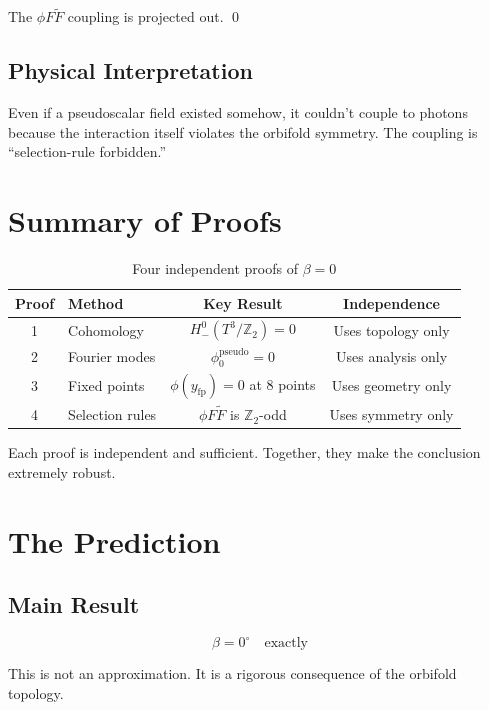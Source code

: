 \documentclass[12pt,a4paper]{article}
\begin{document}
The $\phi F\tilde{F}$ coupling is projected out. \qed

\subsection{Physical Interpretation}

Even if a pseudoscalar field existed somehow, it couldn't couple to photons because the interaction itself violates the orbifold symmetry. The coupling is ``selection-rule forbidden.''

\section{Summary of Proofs}

\begin{table}[h]
\centering
\begin{tabular}{clcc}
\toprule
Proof & Method & Key Result & Independence \\
\midrule
1 & Cohomology & $H^0_-(T^3/\mathbb{Z}_2) = 0$ & Uses topology only \\
2 & Fourier modes & $\phi_0^{\text{pseudo}} = 0$ & Uses analysis only \\
3 & Fixed points & $\phi(y_{\text{fp}}) = 0$ at 8 points & Uses geometry only \\
4 & Selection rules & $\phi F\tilde{F}$ is $\mathbb{Z}_2$-odd & Uses symmetry only \\
\bottomrule
\end{tabular}
\caption{Four independent proofs of $\beta = 0$}
\end{table}

Each proof is independent and sufficient. Together, they make the conclusion extremely robust.

\section{The Prediction}

\subsection{Main Result}

\begin{equation}
\boxed{\beta = 0^\circ \quad \text{exactly}}
\end{equation}

This is not an approximation. It is a rigorous consequence of the orbifold topology.
\end{document}
